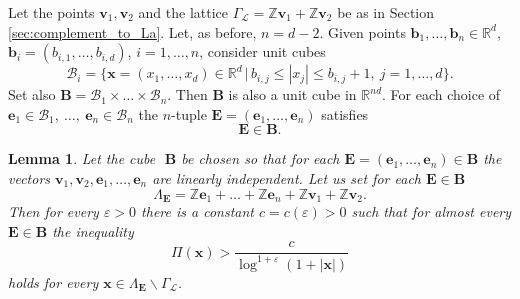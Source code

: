 \documentclass[a4paper,12pt]{article}
\theoremstyle{definition}
\theoremstyle{remark}
\theoremstyle{plain}
\newtheorem{lemma}{Lemma}
\renewcommand{\vec}[1]{\mathbf{#1}}
\renewcommand{\leq}{\leqslant}
\newcommand{\e}{\varepsilon}
\newcommand{\R}{\mathbb{R}}
\newcommand{\Z}{\mathbb{Z}}
\newcommand{\La}{\Lambda}
\newcommand{\Ga}{\Gamma}
\newcommand{\cB}{\mathcal{B}}
\newcommand{\cL}{\mathcal{L}}
\newcommand{\bB}{\mathbf{B}}
\newcommand{\bE}{\mathbf{E}}
\begin{document}
Let the points $\vec v_1,\vec v_2$ and the lattice $\Ga_\cL=\Z\vec v_1+\Z\vec v_2$ be as in Section \ref{sec:complement_to_La}. Let, as before, $n=d-2$. Given points $\vec b_1,\ldots,\vec b_n\in\R^d$, $\vec b_i=(b_{i,1},\ldots,b_{i,d})$, $i=1,\ldots,n$, consider unit cubes
\[
  \cB_i=\Big\{\vec x=(x_1,\ldots,x_d)\in\R^d \,\Big|\, b_{i,j}\leq|x_j|\leq b_{i,j}+1,\ j=1,\ldots,d \Big\}.
\]
Set also $\bB=\cB_1\times\ldots\times\cB_n$. Then $\bB$ is also a unit cube in $\R^{nd}$. For each choice of $\vec e_1\in\cB_1,\ \ldots,\ \vec e_n\in\cB_n$ the $n$-tuple $\bE=(\vec e_1,\ldots,\vec e_n)$ satisfies
\[
  \bE\in\bB.
\]

\begin{lemma}\label{l:main_metric_argument}
  Let the cube\,\ $\bB$ be chosen so that for each $\bE=(\vec e_1,\ldots,\vec e_n)\in\bB$ the vectors $\vec v_1,\vec v_2,\vec e_1,\ldots,\vec e_n$ are linearly independent. Let us set for each $\bE\in\bB$
  \[
    \La_\bE=\Z\vec e_1+\ldots+\Z\vec e_n+\Z\vec v_1+\Z\vec v_2.
  \]
  Then for every $\e>0$ there is a constant $c=c(\e)>0$ such that for almost every $\bE\in\bB$ the inequality
  \[
    \Pi(\vec x)>\frac c{\log^{1+\e}(1+|\vec x|)}
  \]
  holds for every $\vec x\in\La_\bE\backslash\Ga_\cL$.
\end{lemma}
\end{document}
